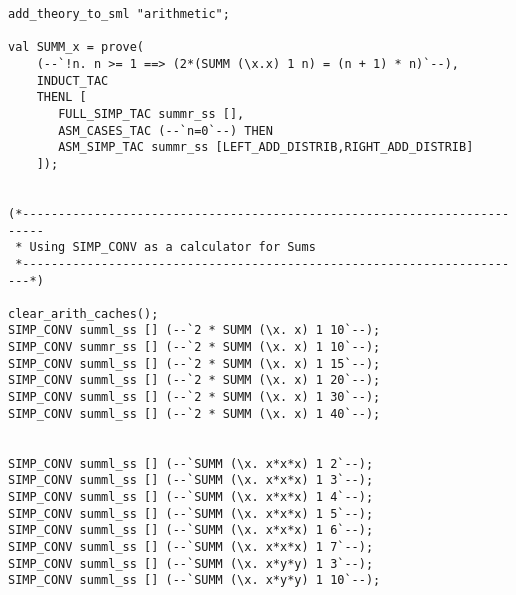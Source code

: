 \documentclass[a4]{article}
\begin{document}
\begin{verbatim}
add_theory_to_sml "arithmetic";

val SUMM_x = prove(
    (--`!n. n >= 1 ==> (2*(SUMM (\x.x) 1 n) = (n + 1) * n)`--),
    INDUCT_TAC
    THENL [
       FULL_SIMP_TAC summr_ss [],
       ASM_CASES_TAC (--`n=0`--) THEN
       ASM_SIMP_TAC summr_ss [LEFT_ADD_DISTRIB,RIGHT_ADD_DISTRIB]
    ]);


(*-------------------------------------------------------------------------
 * Using SIMP_CONV as a calculator for Sums
 *-----------------------------------------------------------------------*)

clear_arith_caches();
SIMP_CONV summl_ss [] (--`2 * SUMM (\x. x) 1 10`--);
SIMP_CONV summr_ss [] (--`2 * SUMM (\x. x) 1 10`--);
SIMP_CONV summl_ss [] (--`2 * SUMM (\x. x) 1 15`--);
SIMP_CONV summl_ss [] (--`2 * SUMM (\x. x) 1 20`--);
SIMP_CONV summl_ss [] (--`2 * SUMM (\x. x) 1 30`--);
SIMP_CONV summl_ss [] (--`2 * SUMM (\x. x) 1 40`--);


SIMP_CONV summl_ss [] (--`SUMM (\x. x*x*x) 1 2`--);
SIMP_CONV summl_ss [] (--`SUMM (\x. x*x*x) 1 3`--);
SIMP_CONV summl_ss [] (--`SUMM (\x. x*x*x) 1 4`--);
SIMP_CONV summl_ss [] (--`SUMM (\x. x*x*x) 1 5`--);
SIMP_CONV summl_ss [] (--`SUMM (\x. x*x*x) 1 6`--);
SIMP_CONV summl_ss [] (--`SUMM (\x. x*x*x) 1 7`--);
SIMP_CONV summl_ss [] (--`SUMM (\x. x*y*y) 1 3`--);
SIMP_CONV summl_ss [] (--`SUMM (\x. x*y*y) 1 10`--);
\end{verbatim}
\end{document}
